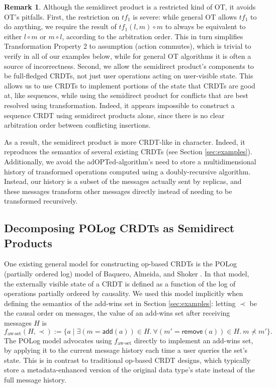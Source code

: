 \documentclass[acmsmall,nonacm]{acmart}
\newcommand{\msf}[1]{\ensuremath{\mathsf{#1}}}
\theoremstyle{plain}
\theoremstyle{definition}
\newtheorem{myrmk}[mythm]{Remark}
\begin{document}
\begin{myrmk}
Although the semidirect product is a restricted kind of OT, it avoids OT's pitfalls.  First, the restriction on $tf_1$ is severe: while general OT allows $tf_1$ to do anything, we require the result of $tf_1(l, m) \circ m$ to always be equivalent to either $l \circ m$ or $m \circ l$, according to the arbitration order.  This in turn simplifies Transformation Property 2 to assumption (action commutes), which is trivial to verify in all of our examples below, while for general OT algorithms it is often a source of incorrectness.  Second, we allow the semidirect product's components to be full-fledged CRDTs, not just user operations acting on user-visible state.  This allows us to use CRDTs to implement portions of the state that CRDTs are good at, like sequences, while using the semidirect product for conflicts that are best resolved using transformation.  Indeed, it appears impossible to construct a sequence CRDT using semidirect products alone, since there is no clear arbitration order between conflicting insertions.

As a result, the semidirect product is more CRDT-like in character.  Indeed, it reproduces the semantics of several existing CRDTs (see Section \ref{sec:examples}).  Additionally, we avoid the adOPTed-algorithm's need to store a multidimensional history of transformed operations computed using a doubly-recursive algorithm.  Instead, our history is a subset of the messages actually sent by replicas, and these messages transform other messages directly instead of needing to be transformed recursively.
\end{myrmk}


\subsection{Decomposing POLog CRDTs as Semidirect Products}
One existing general model for constructing op-based CRDTs is the POLog (partially ordered log) model of Baquero, Almeida, and Shoker \cite{pure_op_based_crdts_extended}.  In that model, the externally visible state of a CRDT is defined as a function of the log of operations partially ordered by causality.  We used this model implicitly when defining the semantics of the add-wins set in Section \ref{sec:examples}: letting $\prec$ be the causal order on messages, the value of an add-wins set after receiving messages $H$ is
\[
f_{\text{aw-set}}(H, \prec) := \{a \mid \exists (m = \msf{add}(a)) \in H.\ \forall(m' = \msf{remove}(a)) \in H.\ m \nprec m'\}.
\]
The POLog model advocates using $f_{\text{aw-set}}$ directly to implement an add-wins set, by applying it to the current message history each time a user queries the set's state.  This is in contrast to traditional op-based CRDT designs, which typically store a metadata-enhanced version of the original data type's state instead of the full message history.
\end{document}
